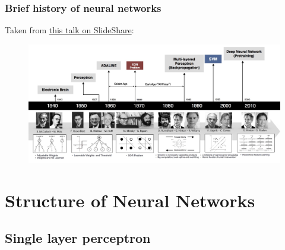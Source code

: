 \documentclass[hyperref={colorlinks=true}]{beamer}
\begin{document}
\begin{frame}%
  \frametitle{Brief history of neural networks}

  Taken from \href{https://www.slideshare.net/deview/251-implementing-deep-learning-using-cu-dnn/4}{this talk on SlideShare}:
  
  \begin{figure}
    \centering
    \includegraphics[width=\textwidth]{NN_Timeline.jpg}
  \end{figure}

\end{frame}


\section[Structure of Neural Networks]{Structure of Neural Networks}

\subsection[Single layer perceptron]{Single layer perceptron}
\end{document}
